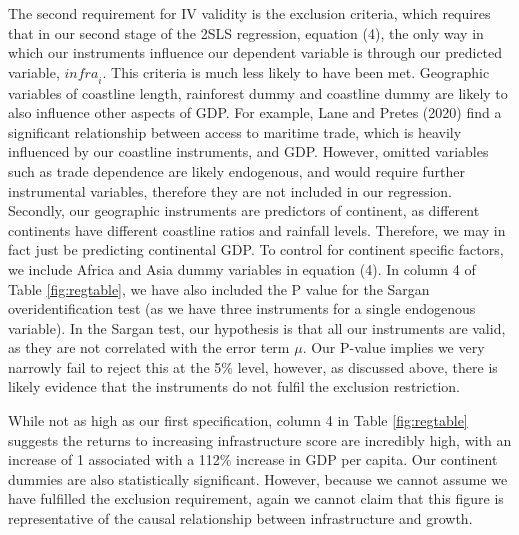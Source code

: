 \documentclass[12pt,a4paper]{article}
\begin{document}
The second requirement for IV validity is the exclusion criteria, which requires that in our second stage of the 2SLS regression, equation (4), the only way in which our instruments influence our dependent variable is through our predicted variable, $\mathit{infra}_i$. This criteria is much less likely to have been met. Geographic variables of coastline length, rainforest dummy and coastline dummy are likely to also influence other aspects of GDP. For example, Lane and Pretes (2020) find a significant relationship between access to maritime trade, which is heavily influenced by our coastline instruments, and GDP. However, omitted variables such as trade dependence are likely endogenous, and would require further instrumental variables, therefore they are not included in our regression. Secondly, our geographic instruments are predictors of continent, as different continents have different coastline ratios and rainfall levels. Therefore, we may in fact just be predicting continental GDP. To control for continent specific factors, we include Africa and Asia dummy variables in equation (4). In column 4 of Table \ref{fig:regtable}, we have also included the P value for the Sargan overidentification test (as we have three instruments for a single endogenous variable). In the Sargan test, our hypothesis is that all our instruments are valid, as they are not correlated with the error term $\mu$. Our P-value implies we very narrowly fail to reject this at the 5\% level, however, as discussed above, there is likely evidence that the instruments do not fulfil the exclusion restriction.

While not as high as our first specification, column 4 in Table \ref{fig:regtable} suggests the returns to increasing infrastructure score are incredibly high, with an increase of 1 associated with a 112\% increase in GDP per capita. Our continent dummies are also statistically significant. However, because we cannot assume we have fulfilled the exclusion requirement, again we cannot claim that this figure is representative of the causal relationship between infrastructure and growth.
\end{document}
